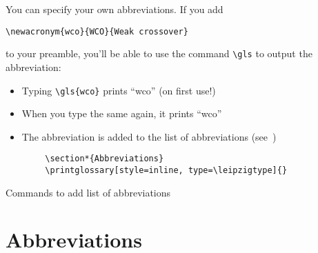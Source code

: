 You can specify your own abbreviations. If you add

\begin{verbatim}
\newacronym{wco}{WCO}{Weak crossover}
\end{verbatim}

to your preamble, you'll be able to use the command \verb+\gls+ to output the
abbreviation:

\begin{itemize}
    \item Typing \verb+\gls{wco}+ prints \enquote{\gls{wco}} (on first use!)
    \item When you type the same again, it prints \enquote{\gls{wco}}
    \item The abbreviation is added to the list of abbreviations
    (see~)
\end{itemize}

\begin{listing}[H]
    \begin{verbatim}
        \section*{Abbreviations}
        \printglossary[style=inline, type=\leipzigtype]{}
    \end{verbatim}
    \caption{Commands to add list of abbreviations}\label{lst:abbreviations}
\end{listing}

\section*{Abbreviations}
\printglossary[style=inline, type=\leipzigtype]{}

\newrefcontext[sorting=nyt]
\printbibliography

